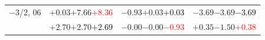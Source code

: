 \documentclass[compress]{beamer}
\begin{document}
\begin{frame}
\begin{tabular}{r | c | c | c}
$-$3/2, 06 & $+0.03$\hspace{0.1 cm}$+7.66$\hspace{0.1 cm}\textcolor{red}{$+8.36$} & $-0.93$\hspace{0.1 cm}$+0.03$\hspace{0.1 cm}\textcolor{black}{$+0.03$} & $-3.69$\hspace{0.1 cm}$-3.69$\hspace{0.1 cm}\textcolor{black}{$-3.69$} \\
           & $+2.70$\hspace{0.1 cm}$+2.70$\hspace{0.1 cm}\textcolor{black}{$+2.69$} & $-0.00$\hspace{0.1 cm}$-0.00$\hspace{0.1 cm}\textcolor{red}{$-0.93$} & $+0.35$\hspace{0.1 cm}$-1.50$\hspace{0.1 cm}\textcolor{red}{$+0.38$} \\
\end{tabular}
\end{frame}
\end{document}
